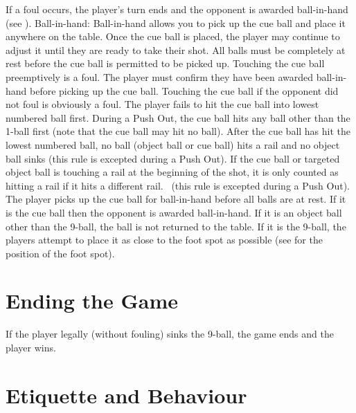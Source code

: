  If a foul occurs, the player's turn ends and the opponent is awarded ball-in-hand (see ).%
Ball-in-hand:
\subruleitem Ball-in-hand allows you to pick up the cue ball and place it anywhere on the table.%
\subruleitem Once the cue ball is placed, the player may continue to adjust it until they are ready to take their shot.%
\subruleitem All balls must be completely at rest before the cue ball is permitted to be picked up. Touching the cue ball preemptively is a foul.%
\subruleitem The player must confirm they have been awarded ball-in-hand before picking up the cue ball. Touching the cue ball if the opponent did not foul is obviously a foul.%
 \FoulsDontStack[9ball]%
 \FoulCircumstances%
\subruleitem The player fails to hit the cue ball into lowest numbered ball first.%
\subruleitem During a Push Out, the cue ball hits any ball other than the 1-ball first (note that the cue ball may hit no ball).
\subruleitem After the cue ball has hit the lowest numbered ball, no ball (object ball or cue ball) hits a rail and no object ball sinks (this rule is excepted during a Push Out).%
\subsubruleitem If the cue ball or targeted object ball is touching a rail at the beginning of the shot, it is only counted as hitting a rail if it hits a different rail.%
\subruleitem \CueBallMiss\ (this rule is excepted during a Push Out).%
\subruleitem \CueBallSink%
\subruleitem \CueBallPreemptive%
\subruleitem The player picks up the cue ball for ball-in-hand before all balls are at rest.%
\subruleitem \ObjectBallTouch[9ball]%
\subruleitem \PushShot%
\subruleitem \BallOffTable%
\subsubruleitem If it is the cue ball then the opponent is awarded ball-in-hand.%
\subsubruleitem If it is an object ball other than the 9-ball, the ball is not returned to the table.%
\subsubruleitem If it is the 9-ball, the players attempt to place it as close to the foot spot as possible (see  for the position of the foot spot).%
\subruleitem \JumpShot%
\subruleitem \TableMovement%
\subruleitem \PoorBehaviour[9ball]%
\IntentionalFoul[9ball]%

\section{Ending the Game} \label{9ball:ending}

 If the player legally (without fouling) sinks the 9-ball, the game ends and the player wins.%
 \IntentionalFoulLoss[9ball]%
 \MisleadingOpponentLoss[9ball]%
 \PoorBehaviorLoss[9ball]%

\section{Etiquette and Behaviour} \label{9ball:etiquette}

\Misleading%
 \DistractingWhileSettingUp%
 \DistractingWhileStriking%
 \Sportsmanship%






